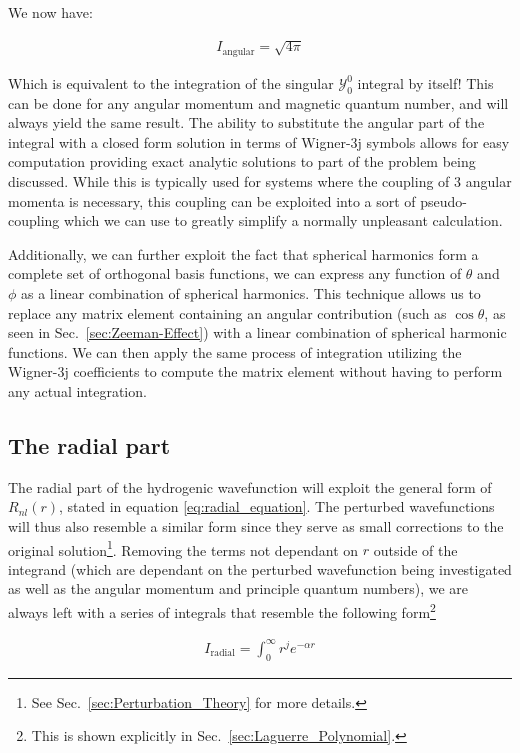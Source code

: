         We now have: 

        \begin{align}
            I_{\text{angular}} = \sqrt{4\pi}
        \end{align}

        Which is equivalent to the integration of the singular $\mathcal{Y}^0_0$ integral by itself! This can be done for any angular momentum and magnetic quantum number, and will always yield the same result. The ability to substitute the angular part of the integral with a closed form solution in terms of Wigner-3j symbols allows for easy computation providing exact analytic solutions to part of the problem being discussed. While this is typically used for systems where the coupling of 3 angular momenta is necessary, this coupling can be exploited into a sort of pseudo-coupling which we can use to greatly simplify a normally unpleasant calculation.

        Additionally, we can further exploit the fact that spherical harmonics form a complete set of orthogonal basis functions, we can express any function of $\theta$ and $\phi$ as a linear combination of spherical harmonics. This technique allows us to replace any matrix element containing an angular contribution (such as $\cos \theta$, as seen in Sec.~\ref{sec:Zeeman-Effect}) with a linear combination of spherical harmonic functions. We can then apply the same process of integration utilizing the Wigner-3j coefficients to compute the matrix element without having to perform any actual integration.


        \subsection{The radial part} \label{sec:The_Radial_Part}
            The radial part of the hydrogenic wavefunction will exploit the general form of $R_{nl}(r)$, stated in equation \ref{eq:radial_equation}. The perturbed wavefunctions will thus also resemble a similar form since they serve as small corrections to the original solution\footnote{See Sec.~\ref{sec:Perturbation_Theory} for more details.}. Removing the terms not dependant on $r$ outside of the integrand (which are dependant on the perturbed wavefunction being investigated as well as the angular momentum and principle quantum numbers), we are always left with a series of integrals that resemble the following form\footnote{This is shown explicitly in Sec.~\ref{sec:Laguerre_Polynomial}.}

            \begin{align}
                I_{\text{radial}} = \int_0^\infty r^j e^{-\alpha r}
            \end{align}

